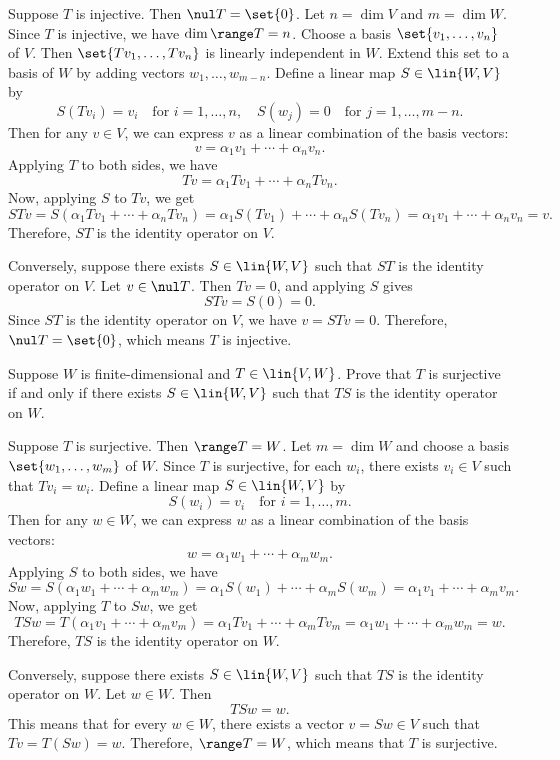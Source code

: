 \begin{sol}
    Suppose $T$ is injective. Then $\nul T = \set{0}$. Let $n = \dim V$ and $m = \dim W$. Since $T$ is injective, we have $\dim \range T = n$. Choose a basis $\set{v_1, \ldots, v_n}$ of $V$. Then $\set{Tv_1, \ldots, Tv_n}$ is linearly independent in $W$. Extend this set to a basis of $W$ by adding vectors $w_1, \ldots, w_{m - n}$. Define a linear map $S \in \lin{W, V}$ by
    \[S(Tv_i) = v_i \quad \text{for } i = 1, \ldots, n, \quad S(w_j) = 0 \quad \text{for } j = 1, \ldots, m - n.\]
    Then for any $v \in V$, we can express $v$ as a linear combination of the basis vectors:
    \[v = \alpha_1 v_1 + \cdots + \alpha_n v_n.\]
    Applying $T$ to both sides, we have
    \[Tv = \alpha_1 Tv_1 + \cdots + \alpha_n Tv_n.\]
    Now, applying $S$ to $Tv$, we get
    \[STv = S(\alpha_1 Tv_1 + \cdots + \alpha_n Tv_n) = \alpha_1 S(Tv_1) + \cdots + \alpha_n S(Tv_n) = \alpha_1 v_1 + \cdots + \alpha_n v_n = v.\]
    Therefore, $ST$ is the identity operator on $V$.

    Conversely, suppose there exists $S \in \lin{W, V}$ such that $ST$ is the identity operator on $V$. Let $v \in \nul T$. Then $Tv = 0$, and applying $S$ gives
    \[STv = S(0) = 0.\]
    Since $ST$ is the identity operator on $V$, we have $v = STv = 0$. Therefore, $\nul T = \set{0}$, which means $T$ is injective.
\end{sol}

\begin{exercise}[3b20]
    Suppose $W$ is finite-dimensional and $T \in \lin{V, W}$. Prove that $T$ is surjective if and only if there exists $S \in \lin{W, V}$ such that $TS$ is the identity operator on $W$.
\end{exercise}

\begin{sol}
    Suppose $T$ is surjective. Then $\range T = W$. Let $m = \dim W$ and choose a basis $\set{w_1, \ldots, w_m}$ of $W$. Since $T$ is surjective, for each $w_i$, there exists $v_i \in V$ such that $Tv_i = w_i$. Define a linear map $S \in \lin{W, V}$ by
    \[S(w_i) = v_i \quad \text{for } i = 1, \ldots, m.\]
    Then for any $w \in W$, we can express $w$ as a linear combination of the basis vectors:
    \[w = \alpha_1 w_1 + \cdots + \alpha_m w_m.\]
    Applying $S$ to both sides, we have
    \[Sw = S(\alpha_1 w_1 + \cdots + \alpha_m w_m) = \alpha_1 S(w_1) + \cdots + \alpha_m S(w_m) = \alpha_1 v_1 + \cdots + \alpha_m v_m.\]
    Now, applying $T$ to $Sw$, we get
    \[TSw = T(\alpha_1 v_1 + \cdots + \alpha_m v_m) = \alpha_1 Tv_1 + \cdots + \alpha_m Tv_m = \alpha_1 w_1 + \cdots + \alpha_m w_m = w.\]
    Therefore, $TS$ is the identity operator on $W$.

    Conversely, suppose there exists $S \in \lin{W, V}$ such that $TS$ is the identity operator on $W$. Let $w \in W$. Then
    \[TSw = w.\]
    This means that for every $w \in W$, there exists a vector $v = Sw \in V$ such that $Tv = T(Sw) = w$. Therefore, $\range T = W$, which means that $T$ is surjective.
\end{sol}

